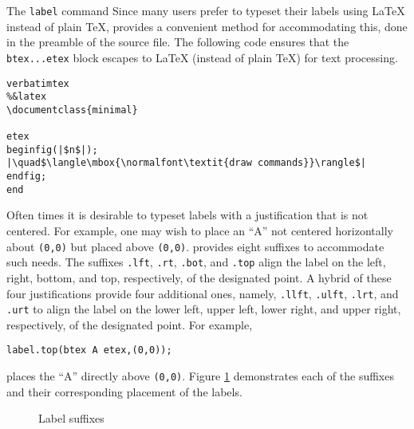 \begin{subsection}{The \texttt{label} command}
Since many \MP{} users prefer to typeset their labels using \LaTeX{} instead of plain \TeX, \MP{} provides a convenient method for accommodating this, done in the preamble of the \MP{} source file.  The following code ensures that the \verb|btex...etex| block escapes to \LaTeX{} (instead of plain \TeX) for text processing.
\begin{lstlisting}[xleftmargin=56bp]
verbatimtex
%&latex
\documentclass{minimal}

etex
beginfig(|$n$|);
|\quad$\langle\mbox{\normalfont\textit{draw commands}}\rangle$|
endfig;
end
\end{lstlisting}

Often times it is desirable to typeset labels with a justification that is not centered.  For example, one may wish to place an ``A'' not centered horizontally about \texttt{(0,0)} but placed above \texttt{(0,0)}. \MP{} provides eight suffixes to accommodate such needs.  The suffixes \texttt{.lft}, \texttt{.rt}, \texttt{.bot}, and \texttt{.top} align the label on the left, right, bottom, and top, respectively, of the designated point.  A hybrid of these four justifications provide four additional ones, namely, \texttt{.llft}, \texttt{.ulft}, \texttt{.lrt}, and \texttt{.urt} to align the label on the lower left, upper left, lower right, and upper right, respectively, of the designated point.  For example, \begin{center}\verb|label.top(btex A etex,(0,0));|\end{center} places the ``A'' directly above \texttt{(0,0)}.  Figure \ref{fig:label} demonstrates each of the suffixes and their corresponding placement of the labels.
\begin{figure}[ht]
	\begin{center}\hfill{}\hfill{}\hfill\mbox{}\end{center}
	\caption{Label suffixes}\label{fig:label}
\end{figure}

\end{subsection}
